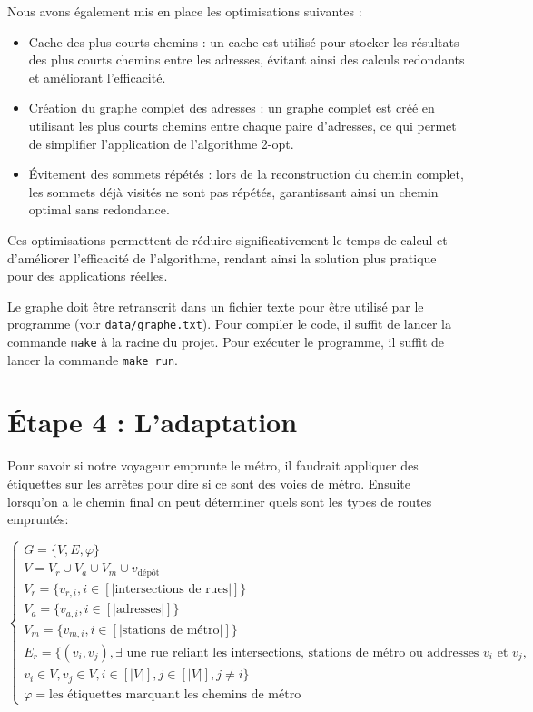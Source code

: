 \documentclass{article}
\begin{document}
Nous avons également mis en place les optimisations suivantes :
\begin{itemize}
    \item Cache des plus courts chemins : un cache est utilisé pour stocker les résultats des plus courts chemins entre les adresses, évitant ainsi des calculs redondants et améliorant l'efficacité.
    \item Création du graphe complet des adresses : un graphe complet est créé en utilisant les plus courts chemins entre chaque paire d'adresses, ce qui permet de simplifier l'application de l'algorithme 2-opt.
    \item Évitement des sommets répétés : lors de la reconstruction du chemin complet, les sommets déjà visités ne sont pas répétés, garantissant ainsi un chemin optimal sans redondance.    
\end{itemize}

Ces optimisations permettent de réduire significativement le temps de calcul et d'améliorer l'efficacité de l'algorithme, rendant ainsi la solution plus pratique pour des applications réelles.

Le graphe doit être retranscrit dans un fichier texte pour être utilisé par le programme (voir \texttt{data/graphe.txt}).
Pour compiler le code, il suffit de lancer la commande \texttt{make} à la racine du projet.
Pour exécuter le programme, il suffit de lancer la commande \texttt{make run}.

\section{Étape 4 : L’adaptation}

Pour savoir si notre voyageur emprunte le métro, il faudrait appliquer des étiquettes sur les arrêtes pour dire si ce sont des voies de métro.
Ensuite lorsqu'on a le chemin final on peut déterminer quels sont les types de routes empruntés: 

$$
\begin{cases}
    G = \{ V, E, \varphi \} \\
    V = V_r \cup V_a \cup V_m \cup v_\text{dépôt} \\
    V_r = \{ v_{r, i}, i \in [|\text{intersections de rues}|] \} \\
    V_a = \{ v_{a, i}, i \in [|\text{adresses}|] \} \\
    V_m = \{ v_{m, i}, i \in [|\text{stations de métro}|] \} \\
    E_r =  \{ (v_{i}, v_{j}), \exists \text{ une rue reliant les intersections, stations de métro ou addresses } v_{i} \text{ et } v_{j},\\ v_{i} \in V, v_{j} \in V, i \in [|V|], j \in [|V|], j \neq i \} \\
    \varphi = \text{les étiquettes marquant les chemins de métro}
\end{cases}
$$
\end{document}
